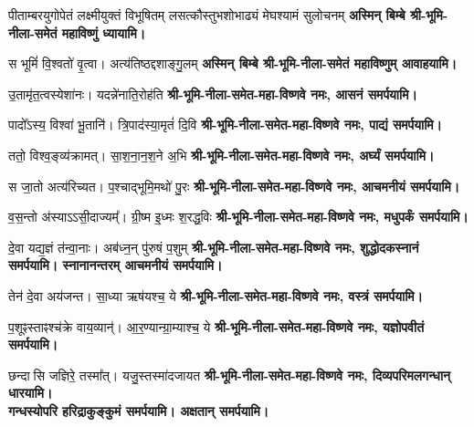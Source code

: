 \begin{center}

\label{sec:start_ekadashi_puja}
\renewcommand{\devAya}{श्री-भूमि-नीला-समेत-महा-विष्णवे नमः,}
{पीताम्बरयुगोपेतं लक्ष्मीयुक्तं विभूषितम्}
{लसत्कौस्तुभशोभाढ्यं मेघश्यामं सुलोचनम्}
\textbf{अस्मिन् बिम्बे श्री-भूमि-नीला-समेतं महाविष्णुं ध्यायामि।}
\medskip

{स भूमिं॑ वि॒श्वतो॑ वृ॒त्वा। अत्य॑तिष्ठद्दशाङ्गु॒लम्}
\textbf{अस्मिन् बिम्बे श्री-भूमि-नीला-समेतं महाविष्णुम् आवाहयामि।}
\medskip

{उ॒तामृ॑त॒त्वस्येशा॑नः। यदन्ने॑नाति॒रोह॑ति}
\textbf{\devAya{} आसनं समर्पयामि।}
\medskip

{पादो᳚ऽस्य॒ विश्वा॑ भू॒तानि॑। त्रि॒पाद॑स्या॒मृतं॑ दि॒वि}
\textbf{\devAya{} पाद्यं समर्पयामि।}
\medskip

{ततो॒ विश्व॒ङ्व्य॑क्रामत्। सा॒श॒ना॒न॒श॒ने अ॒भि}
\textbf{\devAya{} अर्घ्यं समर्पयामि।}
\medskip

{स जा॒तो अत्य॑रिच्यत। प॒श्चाद्भूमि॒मथो॑ पु॒रः}
\textbf{\devAya{} आचमनीयं समर्पयामि।}
\medskip

{व॒स॒न्तो अ॑स्याऽऽसी॒दाज्यम्᳚। ग्री॒ष्म इ॒ध्मः श॒रद्ध॒विः}
\textbf{\devAya{} मधुपर्कं समर्पयामि।}
\medskip

{दे॒वा यद्य॒ज्ञं त॑न्वा॒नाः। अब॑ध्न॒न् पु॑रुषं प॒शुम्}
\textbf{\devAya{} शुद्धोदकस्नानं समर्पयामि। स्नानानन्तरम् आचमनीयं समर्पयामि।}
\medskip

{तेन॑ दे॒वा अय॑जन्त। सा॒ध्या ऋष॑यश्च॒ ये}
\textbf{\devAya{} वस्त्रं समर्पयामि।}
\medskip

{प॒शूꣴस्ताꣴश्च॑क्रे वाय॒व्यान्॑। आ॒र॒ण्यान्ग्रा॒म्याश्च॒ ये}
\textbf{\devAya{} यज्ञोपवीतं समर्पयामि।}
\medskip

{छन्दासि जज्ञिरे॒ तस्मा᳚त्। यजु॒स्तस्मा॑दजायत}
\textbf{\devAya{} दिव्यपरिमलगन्धान् धारयामि।\\
गन्धस्योपरि हरिद्राकुङ्कुमं समर्पयामि। अक्षतान् समर्पयामि।}
\medskip


\end{center}
